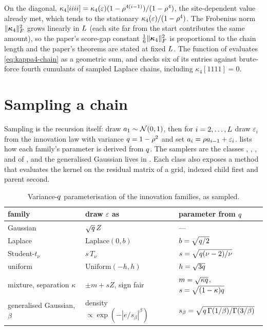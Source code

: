 On the diagonal, $\kappa_4[iiii]=\kappa_4(\varepsilon)(1-\rho^{4(i-1)})/(1-\rho^4)$, the
site-dependent value already met, which tends to the stationary
$\kappa_4(\varepsilon)/(1-\rho^4)$. The Frobenius norm $\lVert \bm{\kappa}_4 \rVert_{F}^2$ grows linearly
in $L$ (each site far from the start contributes the same amount), so the paper's
score-gap constant $\tfrac16\lVert \bm{\kappa}_4 \rVert_{F}^2$ is proportional to the chain length and
the paper's theorems are stated at fixed $L$. The function 
of  evaluates \cref{eq:kappa4-chain} as a geometric
sum, and  checks six of its entries against
brute-force fourth cumulants of sampled Laplace chains, including $\kappa_4[1111]=0$.

\section{Sampling a chain}

Sampling is the recursion itself: draw $a_1\sim\mathcal{N}\!\left(0,1\right)$, then for $i=2,\dots,L$
draw $\varepsilon_i$ from the innovation law with variance $q=1-\rho^2$ and set
$a_i=\rho a_{i-1}+\varepsilon_i$.  lists how each family's parameter
is derived from $q$. The samplers are the classes ,
, ,  and 
of , and the generalised Gaussian lives in
. Each class also exposes a method
 that evaluates the kernel on the residual matrix of a
grid, indexed child first and parent second.

\begin{table}[t]
\centering
\caption{Variance-$q$ parameterisation of the innovation families, as sampled.}
\label{tab:sampling}
\small
\begin{tabular}{@{}lll@{}}
\toprule
family & draw $\varepsilon$ as & parameter from $q$ \\
\midrule
Gaussian & $\sqrt{q}\,Z$ & --- \\
Laplace & $\mathrm{Laplace}(0,b)$ & $b=\sqrt{q/2}$ \\
Student-$t_\nu$ & $s\,T_\nu$ & $s=\sqrt{q(\nu-2)/\nu}$ \\
uniform & $\mathrm{Uniform}(-h,h)$ & $h=\sqrt{3q}$ \\
mixture, separation $\kappa$ & $\pm m+sZ$, sign fair & $m=\sqrt{\kappa q}$, $s=\sqrt{(1-\kappa)q}$ \\
generalised Gaussian, $\beta$ & density $\propto\exp(-|e/s_\beta|^\beta)$ & $s_\beta=\sqrt{q\,\Gamma(1/\beta)/\Gamma(3/\beta)}$ \\
\bottomrule
\end{tabular}
\end{table}

